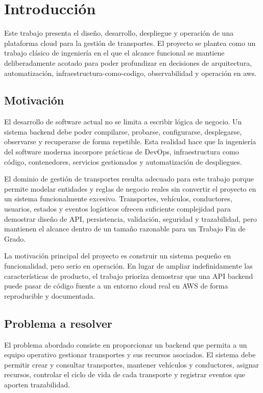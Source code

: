 \chapter{Introducción}
\label{chap:introduccion}

Este trabajo presenta el diseño, desarrollo, despliegue y operación de una plataforma cloud para la gestión de transportes. El proyecto se plantea como un trabajo clásico de ingeniería en el que el alcance funcional se mantiene deliberadamente acotado para poder profundizar en decisiones de arquitectura, automatización, \gls{infraestructura-como-codigo}, observabilidad y operación en \acrfull{aws}.

\section{Motivación}
\label{sec:motivacion}

El desarrollo de software actual no se limita a escribir lógica de negocio. Un sistema backend debe poder compilarse, probarse, configurarse, desplegarse, observarse y recuperarse de forma repetible. Esta realidad hace que la ingeniería del software moderna incorpore prácticas de DevOps, infraestructura como código, contenedores, servicios gestionados y automatización de despliegues.

El dominio de gestión de transportes resulta adecuado para este trabajo porque permite modelar entidades y reglas de negocio reales sin convertir el proyecto en un sistema funcionalmente excesivo. Transportes, vehículos, conductores, usuarios, estados y eventos logísticos ofrecen suficiente complejidad para demostrar diseño de API, persistencia, validación, seguridad y trazabilidad, pero mantienen el alcance dentro de un tamaño razonable para un Trabajo Fin de Grado.

La motivación principal del proyecto es construir un sistema pequeño en funcionalidad, pero serio en operación. En lugar de ampliar indefinidamente las características de producto, el trabajo prioriza demostrar que una API backend puede pasar de código fuente a un entorno cloud real en AWS de forma reproducible y documentada.

\section{Problema a resolver}
\label{sec:problema}

El problema abordado consiste en proporcionar un backend que permita a un equipo operativo gestionar transportes y sus recursos asociados. El sistema debe permitir crear y consultar transportes, mantener vehículos y conductores, asignar recursos, controlar el ciclo de vida de cada transporte y registrar eventos que aporten trazabilidad.

